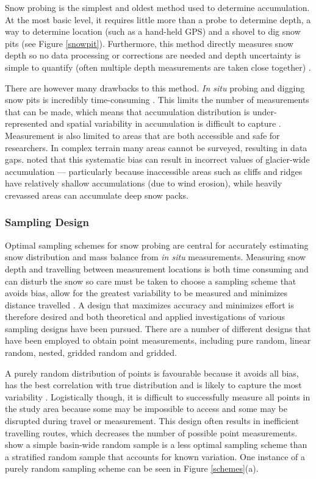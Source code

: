 \documentclass{sfuthesis}
\begin{document}
Snow probing is the simplest and oldest method used to determine accumulation. At the most basic level, it requires little more than a probe to determine depth, a way to determine location (such as a hand-held GPS) and a shovel to dig snow pits (see Figure \ref{snowpit}). Furthermore, this method directly measures snow depth so no data processing or corrections are needed and depth uncertainty is simple to quantify (often multiple depth measurements are taken close together) \citep{Sold2013}. 

There are however many drawbacks to this method. \textit{In situ} probing and digging snow pits is incredibly time-consuming \citep{Deems2006}. This limits the number of measurements that can be made, which means that accumulation distribution is under-represented and spatial variability in accumulation is difficult to capture \citep{Sold2014}. Measurement is also limited to areas that are both accessible and safe for researchers. In complex terrain many areas cannot be surveyed, resulting in data gaps. \cite{Sold2013} noted that this systematic bias can result in incorrect values of glacier-wide accumulation --- particularly because inaccessible areas such as cliffs and ridges have relatively shallow accumulations (due to wind erosion), while heavily crevassed areas can accumulate deep snow packs. 

\subsubsection{Sampling Design}

Optimal sampling schemes for snow probing are central for accurately estimating snow distribution and mass balance from \textit{in situ} measurements. Measuring snow depth and travelling between measurement locations is both time consuming and can disturb the snow so care must be taken to choose a sampling scheme that avoids bias, allow for the greatest variability to be measured and minimizes distance travelled \citep{Shea2010}. A design that maximizes accuracy and minimizes effort is therefore desired \citep{Elder1991} and both theoretical \citep{Trujillo2015} and applied \citep{Kronholm2004,Shea2010} investigations of various sampling designs have been pursued. There are a number of different designs that have been employed to obtain point measurements, including pure random, linear random, nested, gridded random and gridded. 

A purely random distribution of points is favourable because it avoids all bias, has the best correlation with true distribution and is likely to capture the most variability \citep{Kronholm2007, Shea2010}. Logistically though, it is difficult to successfully measure all points in the study area because some may be impossible to access and some may be disrupted during travel or measurement. This design often results in inefficient travelling routes, which decreases the number of possible point measurements. \cite{Elder1991} show a simple basin-wide random sample is a less optimal sampling scheme than a stratified random sample that accounts for known variation. One instance of a purely random sampling scheme can be seen in Figure \ref{schemes}(a). 
\end{document}

